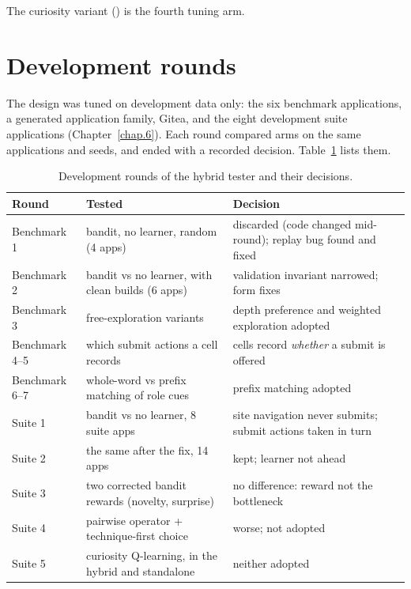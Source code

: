 The curiosity variant () is the fourth tuning arm.

\section{Development rounds}
\label{sec:devrounds}

The design was tuned on development data only: the six benchmark applications, a generated
application family, Gitea, and the eight development suite applications
(Chapter~\ref{chap.6}). Each round compared arms on the same applications and seeds, and
ended with a recorded decision. Table~\ref{tab:devrounds} lists them.

\begin{table}[H]
\centering
\small
\caption{Development rounds of the hybrid tester and their decisions.}
\label{tab:devrounds}
\begin{tabularx}{\textwidth}{@{}lX X@{}}
\toprule
Round & Tested & Decision \\
\midrule
Benchmark 1 & bandit, no learner, random (4 apps) & discarded (code changed mid-round); replay bug found and fixed \\
Benchmark 2 & bandit vs no learner, with clean builds (6 apps) & validation invariant narrowed; form fixes \\
Benchmark 3 & free-exploration variants & depth preference and weighted exploration adopted \\
Benchmark 4--5 & which submit actions a cell records & cells record \emph{whether} a submit is offered \\
Benchmark 6--7 & whole-word vs prefix matching of role cues & prefix matching adopted \\
Suite 1 & bandit vs no learner, 8 suite apps & site navigation never submits; submit actions taken in turn \\
Suite 2 & the same after the fix, 14 apps & kept; learner not ahead \\
Suite 3 & two corrected bandit rewards (novelty, surprise) & no difference: reward not the bottleneck \\
Suite 4 & pairwise operator + technique-first choice & worse; not adopted \\
Suite 5 & curiosity Q-learning, in the hybrid and standalone & neither adopted \\
\bottomrule
\end{tabularx}
\end{table}

